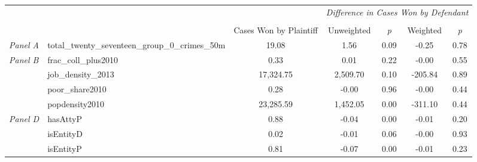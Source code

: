 \begin{tabular}{llccccc}
\toprule
 &  & \textit{} & \multicolumn{4}{c}{\textit{Difference in Cases Won by Defendant}} \\
\cline{4-7}
\\
 &  & Cases Won by Plaintiff & Unweighted & \emph{p} & Weighted & \emph{p} \\
\midrule
\textit{Panel A} & total_twenty_seventeen_group_0_crimes_50m & 19.08 & 1.56 & 0.09 & -0.25 & 0.78 \\
\cline{1-7}
\multirow[c]{4}{3cm}{\textit{Panel B}} & frac_coll_plus2010 & 0.33 & 0.01 & 0.22 & -0.00 & 0.55 \\
 & job_density_2013 & 17,324.75 & 2,509.70 & 0.10 & -205.84 & 0.89 \\
 & poor_share2010 & 0.28 & -0.00 & 0.96 & -0.00 & 0.44 \\
 & popdensity2010 & 23,285.59 & 1,452.05 & 0.00 & -311.10 & 0.44 \\
\cline{1-7}
\multirow[c]{3}{3cm}{\textit{Panel D}} & hasAttyP & 0.88 & -0.04 & 0.00 & -0.01 & 0.20 \\
 & isEntityD & 0.02 & -0.01 & 0.06 & -0.00 & 0.93 \\
 & isEntityP & 0.81 & -0.07 & 0.00 & -0.01 & 0.23 \\
\cline{1-7}
\bottomrule
\end{tabular}
